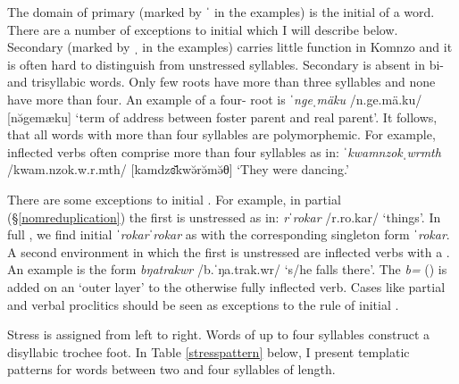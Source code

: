 The domain of primary  (marked by ˈ in the examples) is the initial  of a word. There are a number of exceptions to initial  which I will describe below. Secondary  (marked by ˌ in the examples) carries little function in Komnzo and it is often hard to distinguish from unstressed syllables. Secondary  is absent in bi- and trisyllabic words. Only few roots have more than three syllables and none have more than four. An example of a four- root is \emph{ˈngeˌmäku} /n.ge.mä.ku/ [nə̆gemæku] `term of address between foster parent and real parent'. It follows, that all words with more than four syllables are polymorphemic. For example, inflected verbs often comprise more than four syllables as in: \emph{ˈkwamnzokˌwrmth} /kwam.nzok.w.r.mth/ [kamdzɞ̆kwə̆rə̆mə̆θ] `They were dancing.'%

There are some exceptions to initial . For example, in partial  (\S{}\ref{nomreduplication}) the first  is unstressed as in: \emph{rˈrokar} /r.ro.kar/ `things'. In full , we find initial  \emph{ˈrokarˈrokar} as with the corresponding singleton form \emph{ˈrokar}. A second environment in which the first  is unstressed are inflected verbs with a . An example is the form \emph{bŋatrakwr} /b.ˈŋa.trak.wr/ `s/he falls there'. The  \emph{b=} (\Med{}) is added on an `outer layer' to the otherwise fully inflected verb. Cases like partial  and verbal proclitics should be seen as exceptions to the rule of initial .%

Stress is assigned from left to right. Words of up to four syllables construct a disyllabic trochee foot. In Table \ref{stresspattern} below, I present templatic  patterns for words between two and four syllables of length.

